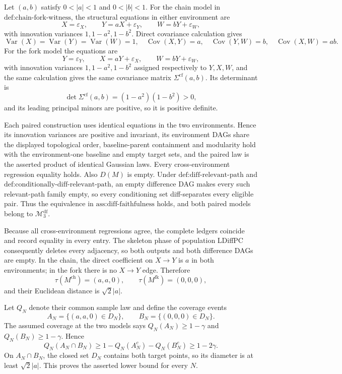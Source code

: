 Let \((a,b)\) satisfy \(0<|a|<1\) and \(0<|b|<1\).  For the chain model in \(\text{def:chain-fork-witness}\), the structural equations in either environment are
\[
 X=\varepsilon_X,\qquad
 Y=aX+\varepsilon_Y,\qquad
 W=bY+\varepsilon_W,
\]
with innovation variances \(1,1-a^2,1-b^2\).  Direct covariance calculation gives
\[
 \operatorname{Var}(X)=\operatorname{Var}(Y)=\operatorname{Var}(W)=1,
 \quad \operatorname{Cov}(X,Y)=a,
 \quad \operatorname{Cov}(Y,W)=b,
 \quad \operatorname{Cov}(X,W)=ab.
\]
For the fork model the equations are
\[
 Y=\varepsilon_Y,\qquad
 X=aY+\varepsilon_X,\qquad
 W=bY+\varepsilon_W,
\]
with innovation variances \(1,1-a^2,1-b^2\) assigned respectively to \(Y,X,W\), and the same calculation gives the same covariance matrix \(\Sigma^{\mathrm{cf}}(a,b)\).  Its determinant is
\[
 \det\Sigma^{\mathrm{cf}}(a,b)=(1-a^2)(1-b^2)>0,
\]
and its leading principal minors are positive, so it is positive definite.

Each paired construction uses identical equations in the two environments.  Hence its innovation variances are positive and invariant, its environment DAGs share the displayed topological order, baseline-parent containment and modularity hold with the environment-one baseline and empty target sets, and the paired law is the asserted product of identical Gaussian laws.  Every cross-environment regression equality holds.  Also \(D(M)\) is empty.  Under \(\text{def:diff-relevant-path}\) and \(\text{def:conditionally-diff-relevant-path}\), an empty difference DAG makes every such relevant-path family empty, so every conditioning set diff-separates every eligible pair.  Thus the equivalence in \(\text{ass:diff-faithfulness}\) holds, and both paired models belong to \(\mathcal M_3^{\mathrm{df}}\).

Because all cross-environment regressions agree, the complete ledgers coincide and record equality in every entry.  The skeleton phase of population LDiffPC consequently deletes every adjacency, so both outputs and both difference DAGs are empty.  In the chain, the direct coefficient on \(X\to Y\) is \(a\) in both environments; in the fork there is no \(X\to Y\) edge.  Therefore
\[
 \tau(M^{\mathrm{ch}})=(a,a,0),\qquad
 \tau(M^{\mathrm{fk}})=(0,0,0),
\]
and their Euclidean distance is \(\sqrt2|a|\).

Let \(Q_N\) denote their common sample law and define the coverage events
\[
 A_N=\{(a,a,0)\in D_N\},\qquad
 B_N=\{(0,0,0)\in D_N\}.
\]
The assumed coverage at the two models says \(Q_N(A_N)\ge1-\gamma\) and \(Q_N(B_N)\ge1-\gamma\).  Hence
\[
 Q_N(A_N\cap B_N)
 \ge1-Q_N(A_N^c)-Q_N(B_N^c)
 \ge1-2\gamma.
\]
On \(A_N\cap B_N\), the closed set \(D_N\) contains both target points, so its diameter is at least \(\sqrt2|a|\).  This proves the asserted lower bound for every \(N\).
